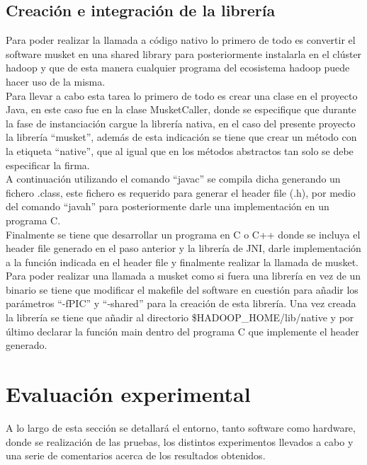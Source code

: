 \documentclass[conference]{IEEEtran}
\begin{document}

\subsection{Creación e integración de la librería}
Para poder realizar la llamada a código nativo lo primero de todo es convertir el software musket en una shared library para posteriormente instalarla en el clúster hadoop y que  de esta manera cualquier programa del ecosistema hadoop puede hacer uso de la misma.\\
Para llevar a cabo esta tarea lo primero de todo es crear una clase en el proyecto Java, en este caso fue en la clase MusketCaller, donde se especifique que durante la fase de instanciación cargue la librería nativa, en el caso del presente proyecto la librería ``musket'', además de esta indicación se tiene que crear un método con la etiqueta ``native'', que al igual que en los métodos abstractos tan solo se debe especificar la firma.\\
A continuación utilizando el comando ``javac'' se compila dicha generando un fichero .class, este fichero es requerido para generar el header file (.h), por medio del comando ``javah'' para posteriormente darle una implementación en un programa C.\\
Finalmente se tiene que desarrollar un programa en C o C++ donde se incluya el header file generado en el paso anterior y la librería de JNI, darle implementación a la función indicada en el header file y finalmente realizar la llamada de musket.\\
Para poder realizar una llamada a musket como si fuera una librería en vez de un binario se tiene que modificar el makefile del software en cuestión para añadir los parámetros ``-fPIC'' y ``-shared'' para la creación de esta librería. Una vez creada la librería se tiene que añadir al directorio \$HADOOP\_HOME/lib/native y por último declarar la función main dentro del programa C que implemente el header generado.

\section{Evaluación experimental}
A lo largo de esta sección se detallará el entorno, tanto software como hardware, donde se realización de las pruebas, los distintos experimentos llevados a cabo y una serie de comentarios acerca de los resultados obtenidos.
\end{document}
